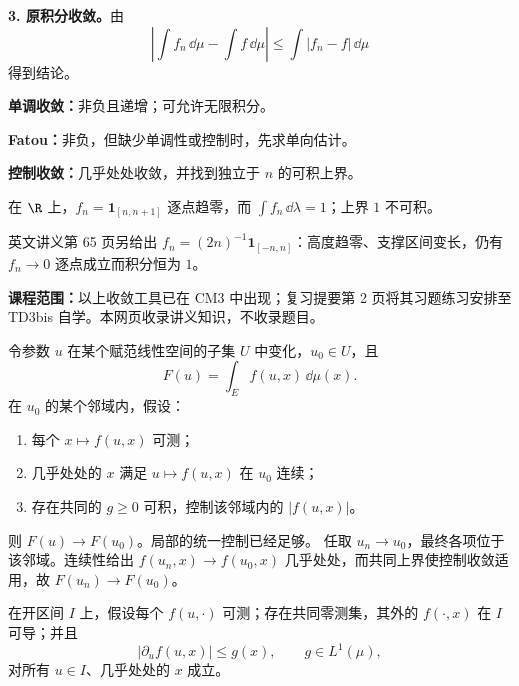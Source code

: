 \textbf{3. 原积分收敛。}由
\[
\left|\int f_n\,\dd\mu-\int f\,\dd\mu\right|
\le\int|f_n-f|\,\dd\mu
\]
得到结论。

\textbf{单调收敛：}非负且递增；可允许无限积分。

\textbf{Fatou：}非负，但缺少单调性或控制时，先求单向估计。

\textbf{控制收敛：}几乎处处收敛，并找到独立于 $n$ 的可积上界。

在 $\R$ 上，$f_n=\mathbf1_{[n,n+1]}$ 逐点趋零，而 $\int f_n\,\dd\lambda=1$；上界 $1$ 不可积。

英文讲义第 65 页另给出 $f_n=(2n)^{-1}\mathbf1_{[-n,n]}$：高度趋零、支撑区间变长，仍有 $f_n\to0$ 逐点成立而积分恒为 $1$。

\textbf{课程范围：}以上收敛工具已在 CM3 中出现；复习提要第 2 页将其习题练习安排至 TD3bis 自学。本网页收录讲义知识，不收录题目。

令参数 $u$ 在某个赋范线性空间的子集 $U$ 中变化，$u_0\in U$，且
\[
F(u)=\int_E f(u,x)\,\dd\mu(x).
\]
在 $u_0$ 的某个邻域内，假设：
\begin{enumerate}
\item 每个 $x\mapsto f(u,x)$ 可测；
\item 几乎处处的 $x$ 满足 $u\mapsto f(u,x)$ 在 $u_0$ 连续；
\item 存在共同的 $g\ge0$ 可积，控制该邻域内的 $|f(u,x)|$。
\end{enumerate}
则 $F(u)\to F(u_0)$。局部的统一控制已经足够。
任取 $u_n\to u_0$，最终各项位于该邻域。连续性给出 $f(u_n,x)\to f(u_0,x)$ 几乎处处，而共同上界使控制收敛适用，故 $F(u_n)\to F(u_0)$。

在开区间 $I$ 上，假设每个 $f(u,\cdot)$ 可测；存在共同零测集，其外的 $f(\cdot,x)$ 在 $I$ 可导；并且
\[
|\partial_u f(u,x)|\le g(x),\qquad g\in L^1(\mu),
\]
对所有 $u\in I$、几乎处处的 $x$ 成立。

